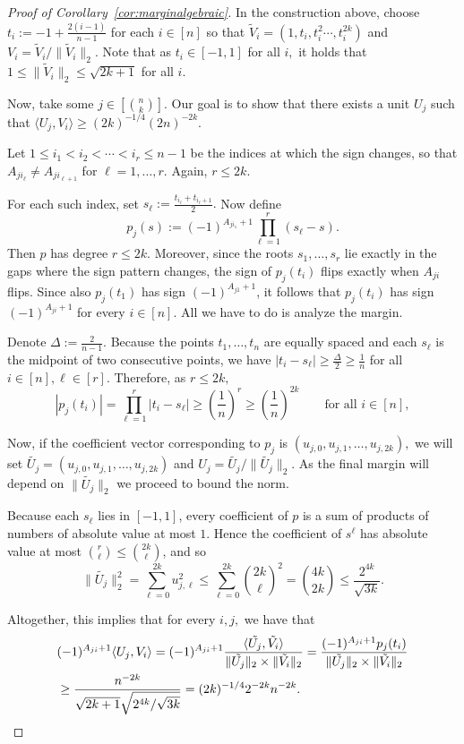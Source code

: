 \documentclass[preprint]{article}
\begin{document}
\begin{proof}[Proof of Corollary~\ref{cor:marginalgebraic}] In the construction above, choose \(
 t_i := -1 + \frac{2(i-1)}{n-1}
\) for each $i\in [n]$ so that $\tilde{V}_i = (1 ,t_i, t_i^2 \cdots ,t_i^{2k})$ and 
$V_i = \tilde{V}_i/\|\tilde{V}_i\|_2.$ Note that as $t_i \in [-1,1]$ for all $i,$ it holds that $1\le \|\tilde{V}_i\|_2\leq \sqrt{2k+1}$ for all $i.$

Now, take some $j\in [\binom{n}{k}].$ Our goal is to show that there exists a unit $U_j$ such that $\langle U_j, V_i\rangle\ge (2k)^{-1/4}(2n)^{-2k}.$

Let \(
1 \le i_1 < i_2 < \cdots < i_r \le n-1
\)
be the indices at which the sign changes, so that $A_{ji_\ell} \neq A_{ji_{\ell+1}}$ for
$\ell = 1, \dots, r$. Again, $r\le 2k.$ 

For each such index, set
\(
 s_\ell := \frac{t_{i_\ell} + t_{i_\ell+1}}{2}.
\)
Now define
\[
 p_j(s) := (-1)^{A_{ji_1}+1}\prod_{\ell=1}^r (s_\ell - s).
\]
Then $p$ has degree $r \le 2k$. Moreover, since the roots $s_1, \dots, s_r$ lie exactly in the gaps
where the sign pattern changes, the sign of $p_j(t_i)$ flips exactly when $A_{ji}$ flips. Since also
$p_j(t_1)$ has sign $(-1)^{A_{j1}+1}$, it follows that
$p_j(t_i)$ has sign $(-1)^{A_{ji}+1}$ for every $i\in [n].$ All we have to do is analyze the margin.

Denote 
\(
\Delta := \frac{2}{n-1}.
\)
Because the points $t_1, \dots, t_n$ are equally spaced and each $s_\ell$ is the midpoint of two
consecutive points, we have
\(
|t_i - s_\ell| \ge \frac{\Delta}{2} \ge \frac{1}{n}\) for all $i\in [n], \ell \in [r].$
Therefore, as $r\le 2k,$
\[
|p_j(t_i)| = \prod_{\ell=1}^r |t_i - s_\ell|
\ge \left(\frac{1}{n}\right)^r
\ge \left(\frac{1}{n}\right)^{2k}
\qquad \text{for all } i \in [n],
\]

Now, if the coefficient vector corresponding to $p_j$ is $(u_{j,0}, u_{j,1}, \ldots, u_{j,2k}),$ we will set $\tilde{U_j} = (u_{j,0}, u_{j,1}, \ldots, u_{j,2k})$ and 
$U_j = \tilde{U_j}/\|\tilde{U_j}\|_2.$ As the final margin will depend on $\|\tilde{U_j}\|_2$ we proceed to bound the norm.

Because each $s_\ell$ lies in $[-1,1]$, every coefficient of $p$ is a sum of products of numbers of
absolute value at most $1$. Hence the coefficient of $s^\ell$ has absolute value at most $\binom{r}{\ell}\le \binom{2k}{\ell}$,
and so
\[
\|\tilde{U_j}\|_2^2 = 
\sum_{\ell = 0}^{2k} u_{j,\ell}^2\le 
\sum_{\ell=0}^{2k} \binom{2k}{\ell}^2
= \binom{4k}{2k}\le \frac{2^{4k}}{\sqrt{3k}}.
\]

Altogether, this implies that for every $i,j,$ we have that 
\begin{align*}
& (-1)^{A_{ji} + 1}\langle U_j, V_i\rangle = 
(-1)^{A_{ji} + 1}
\frac{\langle \tilde{U_j}, \tilde{V_i}\rangle}{\|\tilde{U_j}\|_2 \times \|\tilde{V_i}\|_2}
= 
\frac{(-1)^{A_{ji} + 1}p_j(t_i)}{\|\tilde{U_j}\|_2 \times \|\tilde{V_i}\|_2} 
\\
&\ge 
\frac{n^{-2k}}{\sqrt{2k+1}\sqrt{2^{4k}/\sqrt{3k}}} = 
(2k)^{-1/4}2^{-2k}n^{-2k}.\qedhere
\end{align*}

\end{proof}
\end{document}
